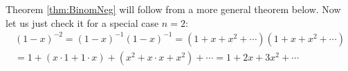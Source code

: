 

\setcounter{section}{2}
\setcounter{subsection}{4}
\setcounter{dfn}{14}


Theorem \ref{thm:BinomNeg} will follow from a more general theorem below.
Now let us just check it for a special case $n=2$:
\begin{multline*}
(1-x)^{-2} = (1-x)^{-1} (1-x)^{-1} = (1 + x + x^2 + \cdots)(1 + x + x^2 + \cdots)\\
= 1 + (x \cdot 1 + 1 \cdot x) + (x^2 + x \cdot x + x^2) + \cdots
= 1 + 2x + 3x^2 + \cdots
\end{multline*}


